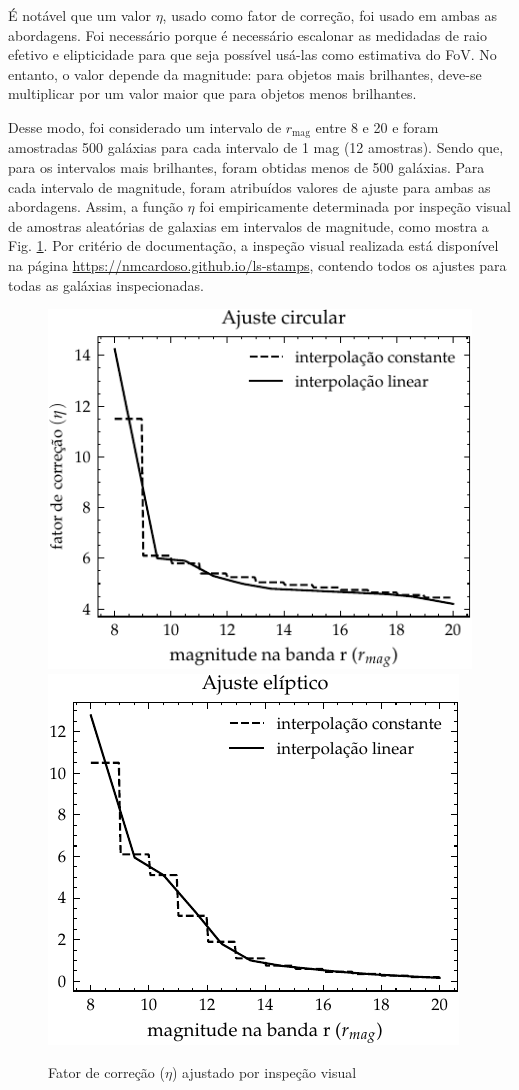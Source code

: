 É notável que um valor $\eta$, usado como fator de correção, foi usado em ambas as abordagens. Foi necessário porque é necessário escalonar as medidadas de raio efetivo e elipticidade para que seja possível usá-las como estimativa do FoV. No entanto, o valor depende da magnitude: para objetos mais brilhantes, deve-se multiplicar por um valor maior que para objetos menos brilhantes.

Desse modo, foi considerado um intervalo de $r_{\mathrm{mag}}$ entre 8 e 20 e foram amostradas 500 galáxias para cada intervalo de 1 mag (12 amostras). Sendo que, para os intervalos mais brilhantes, foram obtidas menos de 500 galáxias. Para cada intervalo de magnitude, foram atribuídos valores de ajuste para ambas as abordagens. Assim, a função $\eta$ foi empiricamente determinada por inspeção visual de amostras aleatórias de galaxias em intervalos de magnitude, como mostra a Fig. \ref{fig:eta}. Por critério de documentação, a inspeção visual realizada está disponível na página \url{https://nmcardoso.github.io/ls-stamps}, contendo todos os ajustes para todas as galáxias inspecionadas.

\begin{figure}[!ht]
  \centering
  \includegraphics[width=0.51\linewidth]{notebooks/plots/correction_factor_circ.pdf}\hfill
  \includegraphics[width=0.48\linewidth]{notebooks/plots/correction_factor_ellip.pdf}
  \caption{Fator de correção ($\eta$) ajustado por inspeção visual}
  \label{fig:eta}
\end{figure}


